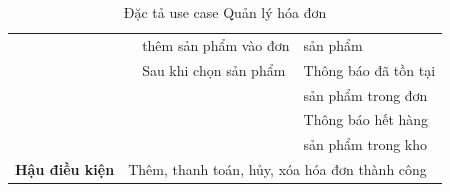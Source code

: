 \documentclass[../DoAn.tex]{subfiles}
\begin{document}
\begin{table}[H]
\begin{tabular}{|l|c|l|l|}
                                                 &                                                                         & thêm sản phẩm vào đơn                     & sản phẩm                                        \\ \cline{3-4}
                                                 &                                                                         & Sau khi chọn sản phẩm                     & Thông báo đã tồn tại                            \\
                                                 &                                                                         &                                           & sản phẩm trong đơn                              \\ \cline{4-4}
                                                 &                                                                         &                                           & Thông báo hết hàng                              \\
                                                 &                                                                         &                                           & sản phẩm trong kho                              \\ \hline
        \textbf{Hậu điều kiện}                   & \multicolumn{3}{l|}{Thêm, thanh toán, hủy, xóa hóa đơn thành công}                                                                                                    \\ \hline
    \end{tabular}
    \caption{Đặc tả use case Quản lý hóa đơn}
    \label{table:uc-invoice-manage}
\end{table}
\vfill
\break
\end{document}
